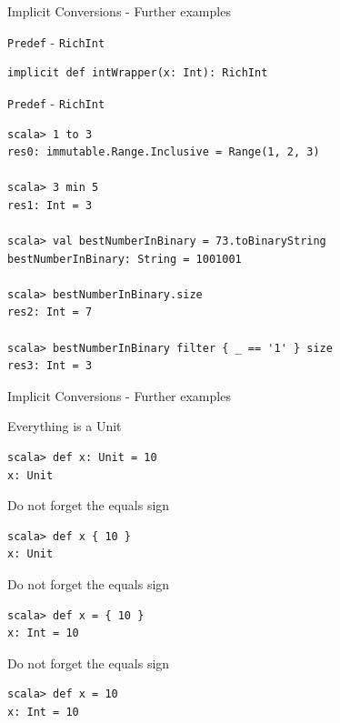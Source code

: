 \begin{frame}[fragile]{Implicit Conversions - Further examples}
\begin{exampleblock}{\lstinline!Predef! - \lstinline!RichInt!}
\begin{lstlisting}
implicit def intWrapper(x: Int): RichInt 
\end{lstlisting}
\end{exampleblock}

\begin{exampleblock}{\lstinline!Predef! - \lstinline!RichInt!}
\begin{lstlisting}
scala> 1 to 3
res0: immutable.Range.Inclusive = Range(1, 2, 3)

scala> 3 min 5
res1: Int = 3

scala> val bestNumberInBinary = 73.toBinaryString
bestNumberInBinary: String = 1001001

scala> bestNumberInBinary.size
res2: Int = 7

scala> bestNumberInBinary filter { _ == '1' } size
res3: Int = 3
\end{lstlisting}
\end{exampleblock}
\end{frame}

\begin{frame}[fragile]{Implicit Conversions - Further examples}
\begin{alertblock}{Everything is a Unit}
\begin{lstlisting}
scala> def x: Unit = 10
x: Unit
\end{lstlisting}
\end{alertblock}
\begin{alertblock}{Do not forget the equals sign}
\begin{lstlisting}
scala> def x { 10 }
x: Unit
\end{lstlisting}
\end{alertblock}
\begin{exampleblock}{Do not forget the equals sign}
\begin{lstlisting}
scala> def x = { 10 }
x: Int = 10
\end{lstlisting}
\end{exampleblock}
\begin{exampleblock}{Do not forget the equals sign}
\begin{lstlisting}
scala> def x = 10
x: Int = 10
\end{lstlisting}
\end{exampleblock}
\end{frame}

